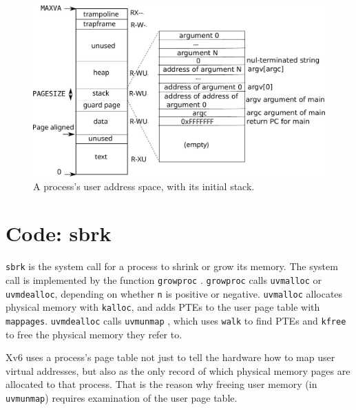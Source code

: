 \begin{figure}[t]
\center
\includegraphics[scale=0.5]{fig/processlayout.pdf}
\caption{A process's user address space, with its initial stack.}
\label{fig:processlayout}
\end{figure}

\section{Code: sbrk}

\lstinline{sbrk}
is the system call for a process to shrink or grow its memory. The system
call is implemented by the function
\lstinline{growproc}
.
\lstinline{growproc} calls \lstinline{uvmalloc} or
\lstinline{uvmdealloc}, depending on whether \lstinline{n} is positive
or negative.
\lstinline{uvmalloc}
allocates physical memory with {\tt kalloc},
and adds PTEs to the user page table with {\tt mappages}.
\lstinline{uvmdealloc} calls
{\tt uvmunmap}
,
which uses {\tt walk} to find PTEs and
{\tt kfree} to free the physical memory they refer to.

Xv6 uses a process's page table not just to tell the hardware how to
map user virtual addresses, but also as the only record of which
physical memory pages are allocated to that process. That is the
reason why freeing user memory (in {\tt uvmunmap}) requires
examination of the user page table.

